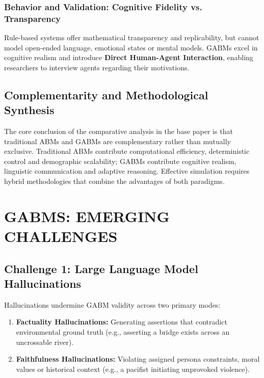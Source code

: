 \documentclass[12pt,a4paper]{report}
\begin{document}
\subsection{Behavior and Validation: Cognitive Fidelity vs. Transparency}
Rule-based systems offer mathematical transparency and replicability, but cannot model open-ended language, emotional states or mental models. GABMs excel in cognitive realism and introduce \textbf{Direct Human-Agent Interaction}, enabling researchers to interview agents regarding their motivations.

\section{Complementarity and Methodological Synthesis}
\label{sec:complementarity}

The core conclusion of the comparative analysis in the base paper is that traditional ABMs and GABMs are complementary rather than mutually exclusive. Traditional ABMs contribute computational efficiency, deterministic control and demographic scalability; GABMs contribute cognitive realism, linguistic communication and adaptive reasoning. Effective simulation requires hybrid methodologies that combine the advantages of both paradigms.


\chapter{GABMS: EMERGING CHALLENGES}
\label{chap:emerging_challenges}

\section{Challenge 1: Large Language Model Hallucinations}
\label{sec:hallucinations}

Hallucinations undermine GABM validity across two primary modes:
\begin{enumerate}[label=\arabic*.]
    \item \textbf{Factuality Hallucinations:} Generating assertions that contradict environmental ground truth (e.g., asserting a bridge exists across an uncrossable river).
    \item \textbf{Faithfulness Hallucinations:} Violating assigned persona constraints, moral values or historical context (e.g., a pacifist initiating unprovoked violence).
\end{enumerate}
\end{document}
